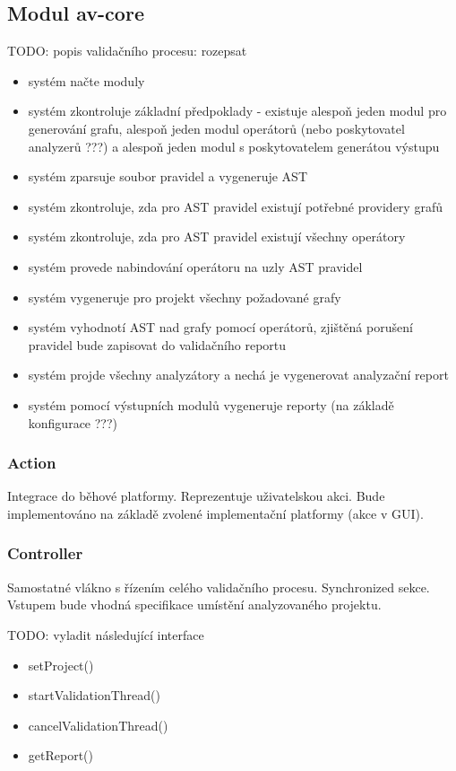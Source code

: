 \subsection{Modul av-core}
TODO: popis validačního procesu: rozepsat
\begin{itemize}
\item systém načte moduly
\item systém zkontroluje základní předpoklady - existuje alespoň jeden modul pro generování grafu, alespoň jeden modul operátorů (nebo poskytovatel analyzerů ???) a alespoň jeden modul s poskytovatelem generátou výstupu
\item systém zparsuje soubor pravidel a vygeneruje AST
\item systém zkontroluje, zda pro AST pravidel existují potřebné providery grafů
\item systém zkontroluje, zda pro AST pravidel existují všechny operátory
\item systém provede nabindování operátoru na uzly AST pravidel
\item systém vygeneruje pro projekt všechny požadované grafy
\item systém vyhodnotí AST nad grafy pomocí operátorů, zjištěná porušení pravidel bude zapisovat do validačního reportu
\item systém projde všechny analyzátory a nechá je vygenerovat analyzační report
\item systém pomocí výstupních modulů vygeneruje reporty (na základě konfigurace ???)
\end{itemize}

\subsubsection{Action}
Integrace do běhové platformy. Reprezentuje uživatelskou akci. Bude implementováno na základě zvolené implementační platformy (akce v GUI).

\subsubsection{Controller}
Samostatné vlákno s řízením celého validačního procesu. Synchronized sekce. Vstupem bude vhodná specifikace umístění analyzovaného projektu.

TODO: vyladit následující interface
\begin{itemize}
\item setProject()
\item startValidationThread()
\item cancelValidationThread()
\item getReport()
\end{itemize}

